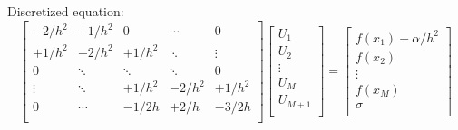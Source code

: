 Discretized equation:
\begin{equation*}
\renewcommand{\arraystretch}{2.8} %
\begin{bmatrix}
-2/h^2 & +1/h^2  & 0 & \cdots & 0 \\
+1/h^2  & -2/h^2 & +1/h^2  & \ddots & \vdots \\
0 & \ddots & \ddots & \ddots & 0 \\
\vdots & \ddots & +1/h^2 & -2/h^2 & +1/h^2\\
0 & \cdots & -1/2h & +2/h & -3/2h  \\
\end{bmatrix}
\begin{bmatrix}
U_1 \\ U_2 \\ \vdots \\ U_M \\ U_{M+1} \\
\end{bmatrix}
=
\begin{bmatrix}
f(x_1) - \alpha/h^2 \\ f(x_2) \\ \vdots \\ f(x_M) \\ \sigma \\
\end{bmatrix}
\end{equation*}


